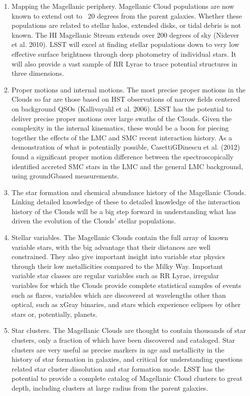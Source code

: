 \begin{enumerate}
\item{Mapping the Magellanic periphery.  Magellanic Cloud populations are now  known to extend out to ~20 degrees from the parent galaxies.  Whether  these populations are related to stellar halos, extended disks, or tidal debris  is not known.  The HI Magellanic Stream extends over 200 degrees of sky  (Nidever et al. 2010).  LSST will excel at finding stellar populations down to  very low effective surface brightness through deep photometry of individual  stars.  It will also provide a vast sample of RR Lyrae to trace potential  structures in three dimensions.  }
\item{Proper motions and internal motions.  The most precise proper motions in  the Clouds so far are those based on HST observations of narrow fields  centered on background QSOs (Kallivayalil et al. 2006).  LSST has the  potential to deliver precise proper motions over large swaths of the Clouds.   Given the complexity in the internal kinematics, these would be a boon for  piecing together the effects of the LMC and SMC recent interaction history.   As a demonstration of what is potentially possible, CasettiGDinescu et al.  (2012) found a significant proper motion difference between the  spectroscopically identified accreted SMC stars in the LMC and the general  LMC background, using groundGbased measurements.  }

\item{The star formation and chemical abundance history of the Magellanic Clouds.   Linking detailed knowledge of these to detailed knowledge of the interaction  history of the Clouds will be a big step forward in understanding what has  driven the evolution of the Clouds’ stellar populations.  }

\item{ Stellar variables.  The Magellanic Clouds contain the full array of known  variable stars, with the big advantage that their distances are well  constrained.  They also give important insight into variable star physics  through their low metallicities compared to the Milky Way.  Important  variable star classes are regular variables such as RR Lyrae, irregular  variables for which the Clouds provide complete statistical samples of events  such as flares, variables which are discovered at wavelengths other than  optical, such as xGray binaries, and stars which experience eclipses by other  stars or, potentially, planets.  }

\item{Star clusters.  The Magellanic Clouds are thought to contain thousands of star  clusters, only a fraction of which have been discovered and cataloged.  Star  clusters are very useful as precise markers in age and metallicity in the  history of star formation in galaxies, and critical for understanding questions  related star cluster dissolution and star formation mode.  LSST has the  potential to provide a complete catalog of Magellanic Cloud clusters to great  depth, including clusters at large radius from the parent galaxies.  }
\end{enumerate}

